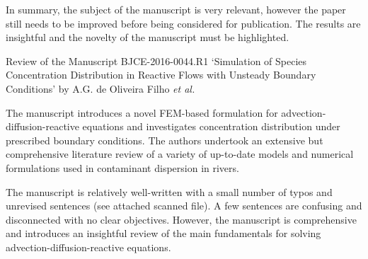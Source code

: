 \documentclass[14pt,twoside]{report}
\begin{document}
In summary, the subject of the manuscript is very relevant, however the paper still needs to be improved before being considered for publication. The results are insightful and the novelty of the manuscript must be highlighted. 

% 

{
  } 



\clearpage


\begin{center}
  {\Large Review of the Manuscript BJCE-2016-0044.R1 `Simulation of Species Concentration Distribution in Reactive Flows with Unsteady Boundary Conditions' by A.G. de Oliveira Filho {\it et al.}}
\end{center}

\medskip

The manuscript introduces a novel FEM-based formulation for advection-diffusion-reactive equations and investigates concentration distribution under prescribed boundary conditions. The authors undertook an extensive but comprehensive literature review of a variety of up-to-date models and numerical formulations used in contaminant dispersion in rivers.

The manuscript is relatively well-written with a small number of typos and unrevised sentences (see attached scanned file). A few sentences are confusing and disconnected with no clear objectives. However, the manuscript is comprehensive and introduces an insightful review of the main fundamentals for solving  advection-diffusion-reactive equations.
\end{document}
